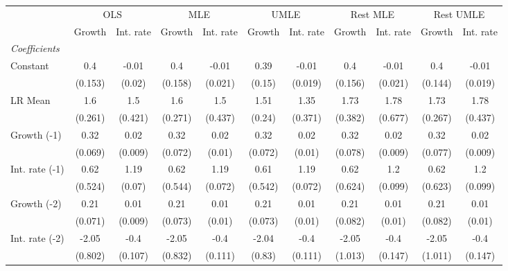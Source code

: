 \begin{table}[htbp] 
	\centering
	\begin{tabular}{@{\extracolsep{4pt}}lcccccccccc@{}}		\hline\hline
		 		 & \multicolumn{2}{c}{OLS} &\multicolumn{2}{c}{MLE} &\multicolumn{2}{c}{UMLE} &\multicolumn{2}{c}{Rest MLE} &\multicolumn{2}{c}{Rest UMLE} \\ 
 		 & Growth 	 & Int. rate 	 & Growth 	 & Int. rate 	 & Growth 	 & Int. rate 	 & Growth 	 & Int. rate 	 & Growth 	 & Int. rate\\\cline{2-3}\cline{4-5}\cline{6-7}\cline{8-9}\cline{10-11}
\rule{0pt}{4ex} 
 \emph{Coefficients} 	  		 & 		 & 		 & 		 & 		 & 		 & 		 & 		 & 		 & 		 &\\ 
\quad Constant 	 & 0.4 	 & -0.01 	 & 0.4 	 & -0.01 	 & 0.39 	 & -0.01 	 & 0.4 	 & -0.01 	 & 0.4 	 & -0.01	 \\ 
 		 & (0.153) 	 & (0.02) 	 & (0.158) 	 & (0.021) 	 & (0.15) 	 & (0.019) 	 & (0.156) 	 & (0.021) 	 & (0.144) 	 & (0.019) 	 \\ 
\quad LR Mean 	 & 1.6 	 & 1.5 	 & 1.6 	 & 1.5 	 & 1.51 	 & 1.35 	 & 1.73 	 & 1.78 	 & 1.73 	 & 1.78	 \\ 
 		 & (0.261) 	 & (0.421) 	 & (0.271) 	 & (0.437) 	 & (0.24) 	 & (0.371) 	 & (0.382) 	 & (0.677) 	 & (0.267) 	 & (0.437) 	 \\ 
\quad Growth (-1) 	 &0.32 	 & 0.02 	 & 0.32 	 & 0.02 	 & 0.32 	 & 0.02 	 & 0.32 	 & 0.02 	 & 0.32 	 & 0.02	 \\ 
 		 & (0.069) 	 & (0.009) 	 & (0.072) 	 & (0.01) 	 & (0.072) 	 & (0.01) 	 & (0.078) 	 & (0.009) 	 & (0.077) 	 & (0.009) 	 \\ 
\quad Int. rate (-1) 	 &0.62 	 & 1.19 	 & 0.62 	 & 1.19 	 & 0.61 	 & 1.19 	 & 0.62 	 & 1.2 	 & 0.62 	 & 1.2	 \\ 
 		 & (0.524) 	 & (0.07) 	 & (0.544) 	 & (0.072) 	 & (0.542) 	 & (0.072) 	 & (0.624) 	 & (0.099) 	 & (0.623) 	 & (0.099) 	 \\ 
\quad Growth (-2) 	 &0.21 	 & 0.01 	 & 0.21 	 & 0.01 	 & 0.21 	 & 0.01 	 & 0.21 	 & 0.01 	 & 0.21 	 & 0.01	 \\ 
 		 & (0.071) 	 & (0.009) 	 & (0.073) 	 & (0.01) 	 & (0.073) 	 & (0.01) 	 & (0.082) 	 & (0.01) 	 & (0.082) 	 & (0.01) 	 \\ 
\quad Int. rate (-2) 	 &-2.05 	 & -0.4 	 & -2.05 	 & -0.4 	 & -2.04 	 & -0.4 	 & -2.05 	 & -0.4 	 & -2.05 	 & -0.4	 \\ 
 		 & (0.802) 	 & (0.107) 	 & (0.832) 	 & (0.111) 	 & (0.83) 	 & (0.111) 	 & (1.013) 	 & (0.147) 	 & (1.011) 	 & (0.147) 	 \\ 

\end{tabular}
\end{table}
